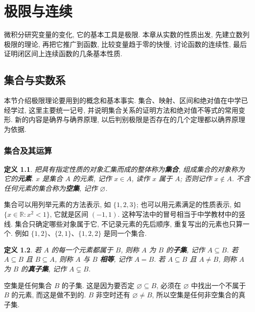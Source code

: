 \documentclass[UTF8,openany]{ctexbook}
\theoremstyle{chinesetextbook}
\newtheorem{definition}{定义}[section]
\begin{document}
\tableofcontents
\clearpage
\chapter{极限与连续}
微积分研究变量的变化, 它的基本工具是极限. 本章从实数的性质出发, 先建立数列极限的理论, 再把它推广到函数, 比较变量趋于零的快慢, 讨论函数的连续性, 最后证明闭区间上连续函数的几条基本性质.
\section{集合与实数系}
本节介绍极限理论要用到的概念和基本事实. 集合、映射、区间和绝对值在中学已经学过, 这里主要统一记号, 并说明集合关系的证明方法和绝对值不等式的常用变形. 新的内容是确界与确界原理, 以后判别极限是否存在的几个定理都以确界原理为依据.
\subsection{集合及其运算}
\begin{definition}
把具有指定性质的对象汇集而成的整体称为\textbf{集合}, 组成集合的对象称为它的\textbf{元素}. $x$ 是集合 $A$ 的元素, 记作 $x\in A$, 读作 $x$ 属于 $A$; 否则记作 $x\notin A$. 不含任何元素的集合称为\textbf{空集}, 记作 $\varnothing$.
\end{definition}
集合可以用列举元素的方法表示, 如 $\{1,2,3\}$; 也可以用元素满足的性质表示, 如 $\{x\in\mathbb R:x^2<1\}$, 它就是区间 $(-1,1)$. 这种写法中的冒号相当于中学教材中的竖线. 集合只确定哪些对象属于它, 不记录元素的先后顺序, 重复写出的元素也只算一个. 例如 $\{1,2\}$、$\{2,1\}$、$\{1,2,2\}$ 是同一个集合.
\begin{definition}
若 $A$ 的每一个元素都属于 $B$, 则称 $A$ 为 $B$ 的\textbf{子集}, 记作 $A\subseteq B$. 若 $A\subseteq B$ 且 $B\subseteq A$, 则称 $A$ 与 $B$ \textbf{相等}, 记作 $A=B$. 若 $A\subseteq B$ 且 $A\ne B$, 则称 $A$ 为 $B$ 的\textbf{真子集}, 记作 $A\subsetneq B$.
\end{definition}
空集是任何集合 $B$ 的子集. 这是因为要否定 $\varnothing\subseteq B$, 必须在 $\varnothing$ 中找出一个不属于 $B$ 的元素, 而这是做不到的. $B$ 非空时还有 $\varnothing\ne B$, 所以空集是任何非空集合的真子集.
\end{document}
